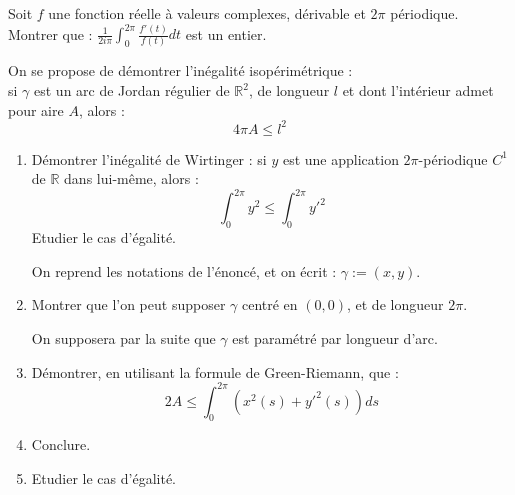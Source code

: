 \begin{exer}
Soit $f$ une fonction r\'eelle \`a valeurs complexes, d\'erivable et  $2 \pi$ p\'eriodique.\\
Montrer que : $\frac{1}{2i\pi} \int_0^{2 \pi} \frac{f'(t)}{f(t)} dt$ est un entier.
\end{exer}

\begin{exer}
On se propose de démontrer l'inégalité isopérimétrique :\\
si $\gamma$ est un arc de Jordan régulier de $\mathbb{R}^2$, de longueur $l$ et dont l'intérieur admet pour aire $A$, alors :
\[4 \pi A \leq l^2\]
\begin{enumerate}
\item Démontrer l'inégalité de Wirtinger : si $y$ est une application $2 \pi$-périodique $C^1$ de $\mathbb{R}$ dans lui-même, alors :
\[\int_{0}^{2 \pi} y^2 \leq \int_{0}^{2 \pi} y'^2\]
Etudier le cas d'égalité.

\smallskip
On reprend les notations de l'énoncé, et on écrit : $\gamma := (x,y)$.
\item Montrer que l'on peut supposer $\gamma$ centré en $(0,0)$, et de longueur $2 \pi$.

\smallskip
On supposera par la suite que $\gamma$ est paramétré par longueur d'arc.
\item Démontrer, en utilisant la formule de Green-Riemann, que :\[2A \leq \int_{0}^{2 \pi} (x^2 (s) + y'^2 (s))ds\]
\item Conclure.
\item Etudier le cas d'égalité.
\end{enumerate}
\end{exer}